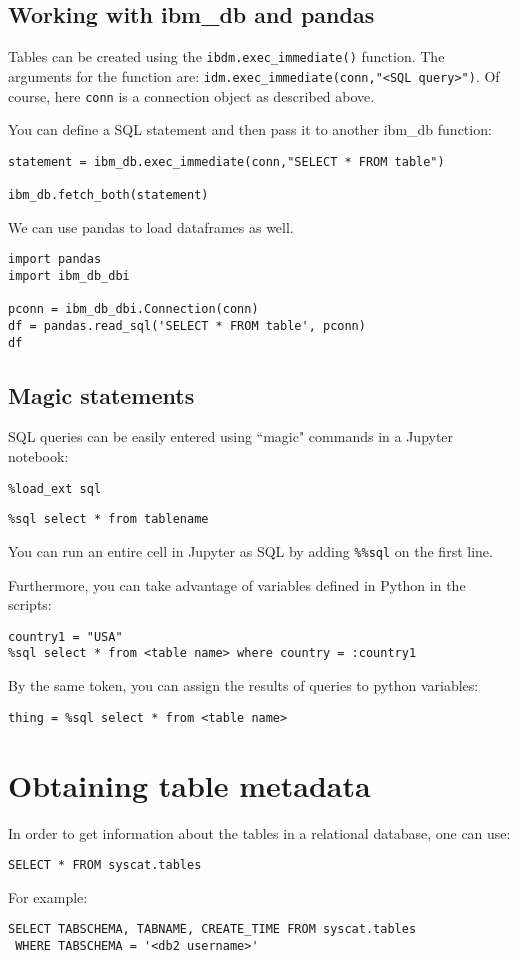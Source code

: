 \documentclass[]{article}
\begin{document}
\subsection{Working with ibm\_db and pandas}
Tables can be created using the \verb|ibdm.exec_immediate()| function.  The arguments for the function are: \verb|idm.exec_immediate(conn,"<SQL query>")|.  Of course, here \verb|conn| is a connection object as described above.

You can define a SQL statement and then pass it to another ibm\_db function:
\begin{verbatim}
statement = ibm_db.exec_immediate(conn,"SELECT * FROM table")

ibm_db.fetch_both(statement)
\end{verbatim}

We can use pandas to load dataframes as well.

\begin{verbatim}
import pandas
import ibm_db_dbi

pconn = ibm_db_dbi.Connection(conn)
df = pandas.read_sql('SELECT * FROM table', pconn)
df
\end{verbatim}
\subsection{Magic statements}
SQL queries can be easily entered using ``magic" commands in a Jupyter notebook:

\verb|%load_ext sql|

\verb|%sql select * from tablename|

You can run an entire cell in Jupyter as SQL by adding \verb|%%sql| on the first line.

Furthermore, you can take advantage of variables defined in Python in the scripts:

\begin{verbatim}
country1 = "USA"
%sql select * from <table name> where country = :country1
\end{verbatim}

By the same token, you can assign the results of queries to python variables:

\begin{verbatim}
thing = %sql select * from <table name>
\end{verbatim}

\section{Obtaining table metadata}
In order to get information about the tables in a relational database, one can use:

\begin{verbatim}
SELECT * FROM syscat.tables
\end{verbatim}

For example:
\begin{verbatim}
SELECT TABSCHEMA, TABNAME, CREATE_TIME FROM syscat.tables
 WHERE TABSCHEMA = '<db2 username>'
\end{verbatim}
\end{document}

